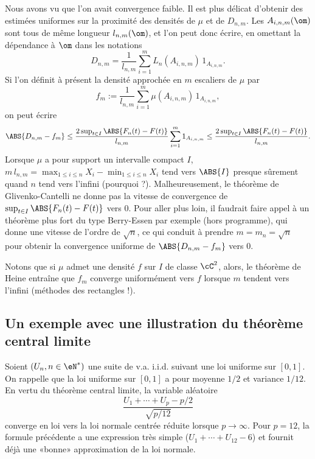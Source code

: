 Nous avons vu que l'on avait convergence faible. Il est plus délicat d'obtenir
des estimées uniformes sur la proximité des densités de $\mu$ et de $D_{n,m}$.
Les $A_{i,n,m}(\om)$ sont tous de même longueur $l_{n,m}(\om)$, et l'on peut
donc écrire, en omettant la dépendance à $\om$ dans les notations
$$
D_{n,m}=\frac{1}{l_{n,m}} \sum_{i=1}^m L_n(A_{i,n,m})\,1_{A_{i,n,m}}.
$$
Si l'on définit à présent la densité approchée en $m$ escaliers de $\mu$
par
$$
 f_m:=\frac{1}{l_{n,m}} \sum_{i=1}^m \mu(A_{i,n,m})\,1_{A_{i,n,m}},
$$
on peut écrire
$$
\ABS{D_{n,m}-f_m} 
\leq \frac{2\sup_{t\in I} \ABS{F_n(t)-F(t)}}{l_{n,m}} 
     \sum_{i=1}^m 1_{A_{i,n,m}}
\leq \frac{2\sup_{t\in I}\ABS{F_n(t)-F(t)}}{l_{n,m}}.
$$
Lorsque $\mu$ a pour support un intervalle compact $I$,
$m\,l_{n,m}=\max_{1\leq i\leq n} X_i-\min_{1\leq i\leq n} X_i$ tend vers
$\ABS{I}$ presque sûrement quand $n$ tend vers l'infini (pourquoi ?).
Malheureusement, le théorème de Glivenko-Cantelli ne donne pas la vitesse de
convergence de $\sup_{t\in I} \ABS{F_n(t)-F(t)}$ vers $0$. Pour aller plus
loin, il faudrait faire appel à un théorème plus fort du type Berry-Essen par
exemple (hors programme), qui donne une vitesse de l'ordre de $\sqrt{n}$, ce
qui conduit à prendre $m=m_n=\sqrt{n}$ pour obtenir la convergence uniforme de
$\ABS{D_{n,m}-f_m}$ vers $0$.

Notons que si $\mu$ admet une densité $f$ sur $I$ de classe $\cC^2$, alors, le
théorème de Heine entraîne que $f_{m}$ converge uniformément vers $f$
lorsque $m$ tendent vers l'infini (méthodes des rectangles !).

\subsection{Un exemple avec une illustration du théorème central limite}

Soient $(U_n,n\in\eN^*)$ une suite de v.a. i.i.d. suivant une loi uniforme sur
$[0,1]$.  On rappelle que la loi uniforme sur $[0,1]$ a pour moyenne $1/2$ et
variance $1/12$. En vertu du théorème central limite, la variable aléatoire
\begin{equation}\label{eq:tcl-loiunif}
\frac{U_1+\cdots+U_{p}-p/2}{\sqrt{p/12}}
\end{equation}
converge en loi vers la loi normale centrée réduite lorsque $p\to\infty$. Pour
$p=12$, la formule précédente a une expression très simple ($U_1+\cdots+U_{12}-6$)
et fournit déjà une «bonne» approximation de la loi normale. 

